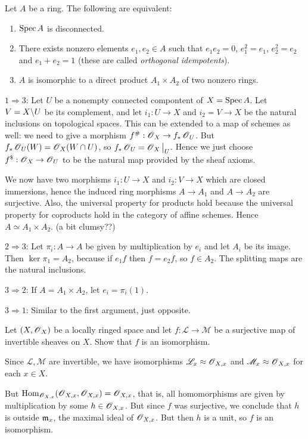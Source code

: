 \documentclass[11pt, english]{article}
\begin{document}
\begin{exc}[Exercise 2.19]
Let $A$ be a ring. The following are equivalent:
\begin{enumerate}
\item $\operatorname{Spec} A$ is disconnected.
\item There exists nonzero elements $e_1,e_2 \in A$ such that $e_1e_2=0$, $e_1^2=e_1$, $e_2^2=e_2$ and $e_1+e_2=1$ (these are called \emph{orthogonal idempotents}).
\item $A$ is isomorphic to a direct product $A_1 \times A_2$ of two nonzero rings.
\end{enumerate}
\end{exc}
\begin{sol}
$1 \Rightarrow 3$: Let $U$ be a nonempty connected compontent of $X=\operatorname{Spec} A$. Let $V = X \backslash U$ be its complement, and let $i_1:U \to X$ and $i_2=V \to X$ be the natural inclusions on topological spaces. This can be extended to a map of schemes as well: we need to give a morphism $f^\#:\operatorname{\mathscr{O}}_X \to f_\ast \operatorname{\mathscr{O}}_U$. But $f_\ast \operatorname{\mathscr{O}}_U(W)=\operatorname{\mathscr{O}}_X(W \cap U)$, so $f_\ast \OO_U = \restr{\OO_X}{U}$. Hence we just choose $f^\$:\operatorname{\mathscr{O}}_X \to \operatorname{\mathscr{O}}_U$ to be the natural map provided by the sheaf axioms.

We now have two morphisms $i_1:U \to X$ and $i_2:V \to X$ which are closed immersions, hence the induced ring morphisms $A \to A_1$ and $A \to A_2$ are surjective. Also, the universal property for products hold because the universal property for coproducts hold in the category of affine schemes. Hence $A \simeq A_1 \times A_2$.  (a bit clumsy??)

$2 \Rightarrow 3$: Let $\pi_i: A \to A$ be given by multiplication by $e_i$ and let $A_i$ be its image. Then $\ker \pi_1 = A_2$, because  if $e_1f$ then $f=e_2f$, so $f \in A_2$. The splitting maps are the natural inclusions. 

$3 \Rightarrow 2$: If $A = A_1 \times A_2$, let $e_i=\pi_i(1)$. 

$3 \Rightarrow 1$: Similar to the first argument, just opposite.
  
\end{sol}

\begin{exc}[Excercise 7.1]
Let $(X,\operatorname{\mathscr{O}}_X)$ be a locally ringed space and let $f:\mathscr L \to \mathscr M$ be a surjective map of invertible sheaves on $X$. Show that $f$ is an isomorphism.  
\end{exc}
\begin{sol}
Since $\mathscr L, \mathscr M$ are invertible, we have isomorphisms $\mathscr L_x \approx \operatorname{\mathscr{O}}_{X,x}$ and $\mathscr M_x \approx \operatorname{\mathscr{O}}_{X,x}$ for each $x \in X$.

But $\operatorname{Hom}_{\operatorname{\mathscr{O}}_{X,x}}(\operatorname{\mathscr{O}}_{X,x},\operatorname{\mathscr{O}}_{X,x})=\operatorname{\mathscr{O}}_{X,x}$, that is, all homomorphisms are given by multiplication by some $h \in \operatorname{\mathscr{O}}_{X,x}$. But since $f$ was surjective, we conclude that $h$ is outside $\mathfrak{m}_x$, the maximal ideal of $\operatorname{\mathscr{O}}_{X,x}$. But then $h$ is a unit, so $f$ is an isomorphism.
\end{sol}
\end{document}
